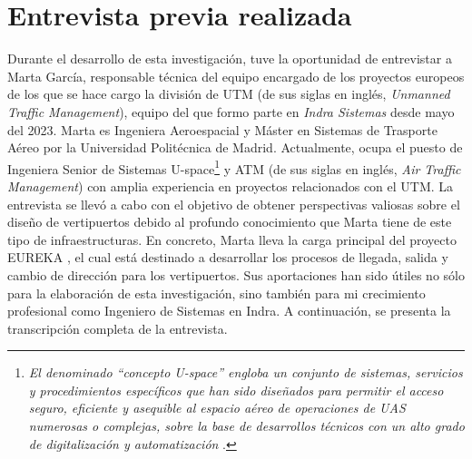 \documentclass[12pt,a4paper]{book}
\begin{document}
  
\newpage

\medskip
\nocite{*}


\clearpage

\newpage

\appendix
\chapter{Entrevista previa realizada} \label{app:entrevista}
Durante el desarrollo de esta investigación, tuve la oportunidad de entrevistar a Marta García, responsable técnica del equipo encargado de los proyectos europeos de los que se hace cargo la división de UTM (de sus siglas en inglés, \textsl{Unmanned Traffic Management}), equipo del que formo parte en \textsl{Indra Sistemas} desde mayo del 2023. Marta es Ingeniera Aeroespacial y Máster en Sistemas de Trasporte Aéreo por la Universidad Politécnica de Madrid. Actualmente, ocupa el puesto de Ingeniera Senior de Sistemas U-space\footnote{\textsl{El denominado ``concepto U-space'' engloba un conjunto de sistemas, servicios y procedimientos específicos que han sido diseñados para permitir el acceso seguro, eficiente y asequible al espacio aéreo de operaciones de UAS numerosas o complejas, sobre la base de desarrollos técnicos con un alto grado de digitalización y automatización} \cite{sostenible_concepto_2023}.} y ATM (de sus siglas en inglés, \textsl{Air Traffic Management}) con amplia experiencia en proyectos relacionados con el UTM. La entrevista se llevó a cabo con el objetivo de obtener perspectivas valiosas sobre el diseño de vertipuertos debido al profundo conocimiento que Marta tiene de este tipo de infraestructuras. En concreto, Marta lleva la carga principal del proyecto EUREKA \cite{proyEUREKA}, el cual está destinado a desarrollar los procesos de llegada, salida y cambio de dirección para los vertipuertos. Sus aportaciones han sido útiles no sólo para la elaboración de esta investigación, sino también para mi crecimiento profesional como Ingeniero de Sistemas en Indra. A continuación, se presenta la transcripción completa de la entrevista. 
\end{document}
